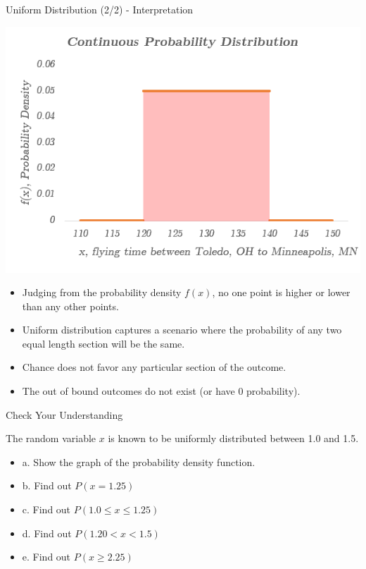 \documentclass{beamer}
\begin{document}
\begin{frame}{Uniform Distribution (2/2) - Interpretation}

\begin{center}
\includegraphics[scale=0.3]{images/section4ContinuousUniformAreaUnderCurve.png}
\end{center}

\begin{itemize}
\item Judging from the probability density $f(x)$, no one point is higher or lower than any other points. 
\item Uniform distribution captures a scenario where the probability of any two equal length section will be the same. 
\item Chance does not favor any particular section of the outcome.
\item The out of bound outcomes do not exist (or have 0 probability). 
\end{itemize}


\end{frame}


\begin{frame}{Check Your Understanding}

The random variable $x$ is known to be uniformly distributed between 1.0 and 1.5. 

\begin{itemize}
\item a. Show the graph of the probability density function.
\item b. Find out $P(x = 1.25)$
\item c. Find out $P(1.0 \leq x \leq 1.25)$
\item d. Find out $P(1.20 < x < 1.5)$
\item e. Find out $P(x \geq 2.25)$
\end{itemize}


\end{frame}
\end{document}

